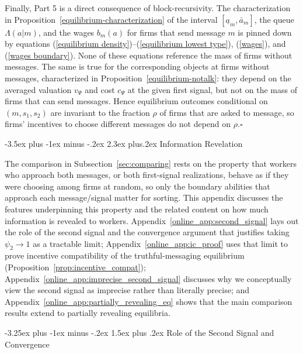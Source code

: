 \documentclass[12pt]{article}
\makeatletter
\renewcommand{\section}{%
  \@startsection{section}{1}{\z@}%
  {-3.5ex plus -1ex minus -.2ex}%
  {2.3ex plus.2ex}%
  {\normalfont\Large\bfseries}%
}
\renewcommand{\subsection}{%
  \@startsection{subsection}{2}{\z@}%
  {-3.25ex plus -1ex minus -.2ex}%
  {1.5ex plus .2ex}%
  {\normalfont\large\bfseries}%
}
\makeatother
\begin{document}
Finally, Part 5 is a direct consequence of block-recursivity. The characterization in Proposition~\ref{equilibrium-characterization} of the interval $[\underline{a}_{m},\bar{a}_{m}]$, the queue $\Lambda(a|m)$, and the wages $b_{m}(a)$ for firms that send message $m$ is pinned down by equations (\ref{equilibrium density})--(\ref{equilibrium lowest type}), (\ref{wages}), and (\ref{wages boundary}). None of these equations reference the mass of firms without messages. The same is true for the corresponding objects at firms without messages, characterized in Proposition~\ref{equilibrium-notalk}: they depend on the averaged valuation $v_{\Psi}$ and cost $c_{\Psi}$ at the given first signal, but not on the mass of firms that can send messages. Hence equilibrium outcomes conditional on $(m,s_{1},s_{2})$ are invariant to the fraction $\rho$ of firms that are asked to message, so firms' incentives to choose different messages do not depend on $\rho$.$\square$






\section{Information Revelation}
\label{online_app:info_revelation}

The comparison in Subsection~\ref{sec:comparing} rests on the property that workers who approach both messages, or both first-signal realizations, behave as if they were choosing among firms at random, so only the boundary abilities that approach each message/signal matter for sorting. This appendix discusses the features underpinning this property and the related content on how much information is revealed to workers. Appendix~\ref{online_app:second_signal} lays out the role of the second signal and the convergence argument that justifies taking $\psi_{2}\to 1$ as a tractable limit; Appendix~\ref{online_app:ic_proof} uses that limit to prove incentive compatibility of the truthful-messaging equilibrium (Proposition~\ref{prop:incentive_compat}); Appendix~\ref{online_app:imprecise_second_signal} discusses why we conceptually view the second signal as imprecise rather than literally precise; and Appendix~\ref{online_app:partially_revealing_eq} shows that the main comparison results extend to partially revealing equilibria.

\subsection{Role of the Second Signal and Convergence}
\label{online_app:second_signal}
\end{document}
